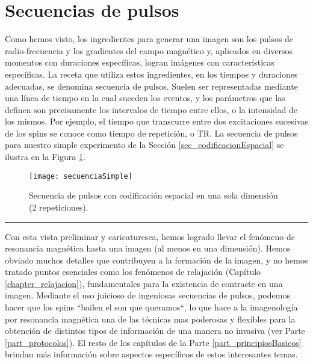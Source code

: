 \section{Secuencias de pulsos}

 Como hemos visto, los ingredientes para generar una imagen son los pulsos de radio-frecuencia y los gradientes del campo magnético y, aplicados en diversos momentos con duraciones específicas, logran imágenes con características específicas. La receta que utiliza estos ingredientes, en los tiempos y duraciones adecuadas, se denomina secuencia de pulsos. Suelen ser representadas mediante una línea de tiempo en la cual suceden los eventos, y los parámetros que las definen son precisamente los intervalos de tiempo entre ellos, o la intensidad de los mismos. Por ejemplo, el tiempo que transcurre entre dos excitaciones sucesivas de los spins se conoce como tiempo de repetición, o TR. La secuencia de pulsos para nuestro simple experimento de la Sección \ref{sec_codificacionEspacial} se ilustra en la Figura \ref{fig:secuenciaSimple}.

\begin{figure}[htb]
 \centering
 \texttt{[image: secuenciaSimple]}
 \caption{Secuencia de pulsos con codificación espacial en una sola dimensión (2 repeticiones).}
 \label{fig:secuenciaSimple}
\end{figure}




\fancybreak{* * *}


Con esta vista preliminar y caricaturesca, hemos logrado llevar el fenómeno de resonancia magnética hasta una imagen (al menos en una dimensión). Hemos obviado muchos detalles que contribuyen a la formación de la imagen, y no hemos tratado puntos esenciales como los fenómenos de relajación (Capítulo \ref{chapter_relajacion}), fundamentales para la existencia de contraste en una imagen. Mediante el uso juicioso de ingeniosas secuencias de pulsos, podemos hacer que los spins ``bailen el son que queramos``, lo que hace a la imagenología por resonancia magnética una de las técnicas mas poderosas y flexibles para la obtención de distintos tipos de información de una manera no invasiva (ver Parte \ref{part_protocolos}). El resto de los capítulos de la Parte \ref{part_principiosBasicos} brindan más información sobre aspectos específicos de estos interesantes temas.


% 
